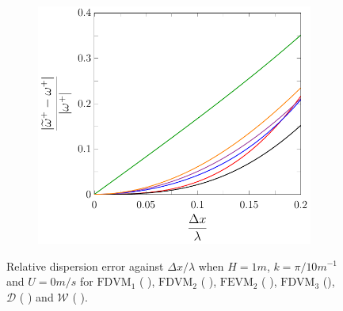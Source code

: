 \begin{figure}
\begin{subfigure}{0.5\textwidth}
	\end{subfigure}
	\par\bigskip
	\begin{subfigure}{0.5\textwidth}
		\includegraphics[width=\textwidth]{./chp4/figures/New/Dispu0Shall.pdf}
	\end{subfigure}
	\caption{Relative dispersion error against $\Delta x / \lambda$ when $H = 1m$, $k = {\pi}/{10} m^{-1}$ and $U = 0 m/s$ for $\text{FDVM}_1$ ({\color{green!60!black} \solidrule}), $\text{FDVM}_2$ ({\color{red} \solidrule}), $\text{FEVM}_2$ ({\color{blue} \solidrule}), $\text{FDVM}_3$ ({\solidrule}), $\mathcal{D}$ ({\color{violet!80!white} \solidrule}) and $\mathcal{W}$ ({\color{orange} \solidrule}).}
	\label{fig:Dispu0Shall}
\end{figure}
